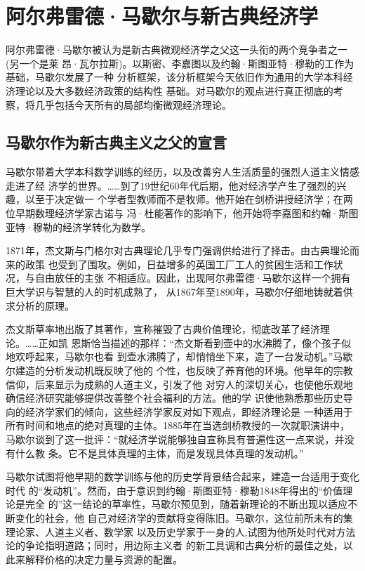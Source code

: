 \chapter{阿尔弗雷德·马歇尔与新古典经济学}

阿尔弗雷德·马歇尔被认为是新古典微观经济学之父这一头衔的两个竞争者之一(另一个是莱
昂·瓦尔拉斯)。以斯密、李嘉图以及约翰·斯图亚特·穆勒的工作为基础，马歇尔发展了一种
分析框架，该分析框架今天依旧作为通用的大学本科经济理论以及大多数经济政策的结构性
基础。对马歇尔的观点进行真正彻底的考察，将几乎包括今天所有的局部均衡微观经济理论。

\section*{马歇尔作为新古典主义之父的宣言}

马歇尔带着大学本科数学训练的经历，以及改善穷人生活质量的强烈人道主义情感走进了经
济学的世界。……到了19世纪60年代后期，他对经济学产生了强烈的兴趣，以至于决定做一
个学者型教师而不是牧师。他开始在剑桥讲授经济学；在两位早期数理经济学家古诺与
冯·杜能著作的影响下，他开始将李嘉图和约翰·斯图亚特·穆勒的经济学转化为数学。

1871年，杰文斯与门格尔对古典理论几乎专门强调供给进行了择击。由古典理论而来的政策
也受到了围攻。例如，日益增多的英国工厂工人的贫困生活和工作状况，与自由放任的主张
不相适应。因此，出现阿尔弗雷德·马歇尔这样一个拥有巨大学识与智慧的人的时机成熟了，
从1867年至1890年，马歇尔仔细地铸就着供求分析的原理。

杰文斯草率地出版了其著作，宣称摧毁了古典价值理论，彻底改革了经济理论。……正如凯
恩斯恰当描述的那样：“杰文斯看到壶中的水沸腾了，像个孩子似地欢呼起来，马歇尔也看
到壶水沸腾了，却悄悄坐下来，造了一台发动机。”马歇尔建造的分析发动机既反映了他的
个性，也反映了养育他的环境。他早年的宗教信仰，后来显示为成熟的人道主义，引发了他
对穷人的深切关心，也使他乐观地确信经济研究能够提供改善整个社会福利的方法。他的学
识使他熟悉那些历史导向的经济学家们的倾向，这些经济学家反对如下观点，即经济理论是
一种适用于所有时间和地点的绝对真理的主体。1885年在当选剑桥教授的一次就职演讲中，
马歇尔谈到了这一批评：“就经济学说能够独自宣称具有普遍性这一点来说，并没有什么教
条。它不是具体真理的主体，而是发现具体真理的发动机。”

马歇尔试图将他早期的数学训练与他的历史学背景结合起来，建造一台适用于变化时代
的“发动机”。然而，由于意识到约翰·斯图亚特·穆勒1848年得出的“价值理论是完全
的”这一结论的草率性，马歇尔预见到，随着新理论的不断出现以适应不断变化的社会，他
自己对经济学的贡献将变得陈旧。马歇尔，这位前所未有的集理论家、人道主义者、数学家
以及历史学家于一身的人,试图为他所处时代对方法论的争论指明道路；同时，用边际主义者
的新工具调和古典分析的最佳之处，以此来解释价格的决定力量与资源的配置。

